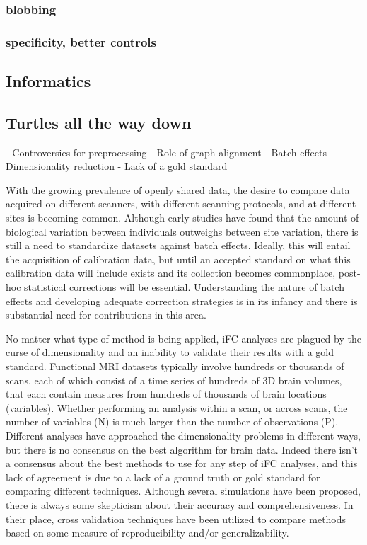 \subsubsection{blobbing}

\subsubsection{specificity, better controls}

\subsection{Informatics}

\subsection{Turtles all the way down}

- Controversies for preprocessing
- Role of graph alignment
- Batch effects
- Dimensionality reduction
- Lack of a gold standard

With the growing prevalence of openly shared data, the desire to compare data
acquired on different scanners, with different scanning protocols, and at
different sites is becoming common. Although early studies have found that the
amount of biological variation between individuals outweighs between site
variation\cite{biswal}, there is still a need to standardize datasets against
batch effects\cite{YanStand}. Ideally, this will entail the acquisition of
calibration data, but until an accepted standard on what this calibration data
will include exists and its collection becomes commonplace, post-hoc
statistical corrections will be essential. Understanding the nature of batch
effects and developing adequate correction strategies is in its infancy and
there is substantial need for contributions in this area.  

No matter what type of method is being applied, iFC analyses are plagued by the
curse of dimensionality and an inability to validate their results with a gold
standard. Functional MRI datasets typically involve hundreds or thousands of
scans, each of which consist of a time series of hundreds of 3D brain volumes,
that each contain measures from hundreds of thousands of brain locations
(variables). Whether performing an analysis within a scan, or across scans, the
number of variables (N) is much larger than the number of observations (P).
Different analyses have approached the dimensionality problems in different
ways, but there is no consensus on the best algorithm for brain data. Indeed
there isn't a consensus about the best methods to use for any step of iFC
analyses, and this lack of agreement is due to a lack of a ground truth or gold
standard for comparing different techniques. Although several simulations have
been proposed, there is always some skepticism about their accuracy and
comprehensiveness. In their place, cross validation techniques have been
utilized to compare methods based on some measure of reproducibility and/or
generalizability.

